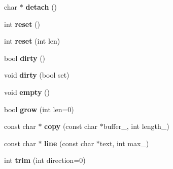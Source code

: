 \begin{DoxyCompactItemize}
\item 
char $\ast$ {\bfseries detach} ()\hypertarget{class_i_dream_sky_1_1_string_a7c68bda3f739e0b745b5159d9c5d1558}{}\label{class_i_dream_sky_1_1_string_a7c68bda3f739e0b745b5159d9c5d1558}

\item 
int {\bfseries reset} ()\hypertarget{class_i_dream_sky_1_1_string_aaefe2fc5f3e73afa944208e0bcc1dd85}{}\label{class_i_dream_sky_1_1_string_aaefe2fc5f3e73afa944208e0bcc1dd85}

\item 
int {\bfseries reset} (int len)\hypertarget{class_i_dream_sky_1_1_string_ad811a45729246dd144d64bb7ff8fb8de}{}\label{class_i_dream_sky_1_1_string_ad811a45729246dd144d64bb7ff8fb8de}

\item 
bool {\bfseries dirty} ()\hypertarget{class_i_dream_sky_1_1_string_a1505bb251fd7c272601a15cf202d840e}{}\label{class_i_dream_sky_1_1_string_a1505bb251fd7c272601a15cf202d840e}

\item 
void {\bfseries dirty} (bool set)\hypertarget{class_i_dream_sky_1_1_string_a393769f89bf0e30e089aa06358eb1b46}{}\label{class_i_dream_sky_1_1_string_a393769f89bf0e30e089aa06358eb1b46}

\item 
void {\bfseries empty} ()\hypertarget{class_i_dream_sky_1_1_string_a815d15beb4344c84cdd68217af601620}{}\label{class_i_dream_sky_1_1_string_a815d15beb4344c84cdd68217af601620}

\item 
bool {\bfseries grow} (int len=0)\hypertarget{class_i_dream_sky_1_1_string_a0a12d4fc0976cb9b213c4adb2ffb3982}{}\label{class_i_dream_sky_1_1_string_a0a12d4fc0976cb9b213c4adb2ffb3982}

\item 
const char $\ast$ {\bfseries copy} (const char $\ast$buffer\+\_\+, int length\+\_)\hypertarget{class_i_dream_sky_1_1_string_a4b4f700f0696c51158db7f4b2a481e0a}{}\label{class_i_dream_sky_1_1_string_a4b4f700f0696c51158db7f4b2a481e0a}

\item 
const char $\ast$ {\bfseries line} (const char $\ast$text, int max\+\_)\hypertarget{class_i_dream_sky_1_1_string_a66702a146802fb481930b0d36c20059f}{}\label{class_i_dream_sky_1_1_string_a66702a146802fb481930b0d36c20059f}

\item 
int {\bfseries trim} (int direction=0)\hypertarget{class_i_dream_sky_1_1_string_a9e2f7ef48df311be8e1f5787d86cc7d2}{}\label{class_i_dream_sky_1_1_string_a9e2f7ef48df311be8e1f5787d86cc7d2}


\end{DoxyCompactItemize}
